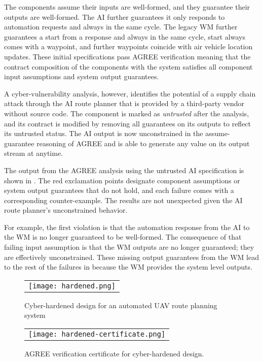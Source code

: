 The components assume their inputs are well-formed, and they guarantee their outputs are well-formed.
The AI further guarantees it only responds to automation requests and always in the same cycle.
The legacy WM further guarantees a start from a response and always in the same cycle, start always comes with a waypoint, and further waypoints coincide with air vehicle location updates.
These initial specifications pass AGREE verification meaning that the contract composition of the components with the system satisfies all component input assumptions and system output guarantees.

A cyber-vulnerability analysis, however, identifies the potential of a supply chain attack through the AI route planner that is provided by a third-party vendor without source code.
The component is marked as \emph{untrusted} after the analysis, and its contract is modified by removing all guarantees on its outputs to reflect its untrusted status.
The AI output is now unconstrained in the assume-guarantee reasoning of AGREE and is able to generate any value on its output stream at anytime.

The output from the AGREE analysis using the untrusted AI specification is shown in .
The red exclamation points designate component assumptions or system output guarantees that do not hold, and each failure comes with a corresponding counter-example.
The results are not unexpected given the AI route planner's unconstrained behavior.

For example, the first violation is that the automation response from the AI to the WM is no longer guaranteed to be well-formed.
The consequence of that failing input assumption is that the WM outputs are no longer guaranteed; they are effectively unconstrained.
These missing output guarantees from the WM lead to the rest of the failures in  because the WM provides the system level outputs.

\begin{figure*}
  \begin{center}
    \begin{tabular}{c}
      \texttt{[image: hardened.png]}
    \end{tabular}
  \end{center}
  \caption{Cyber-hardened design for an automated UAV route planning system}
  \label{fig:hardened}
\end{figure*}

\begin{figure}
  \begin{center}
    \begin{tabular}{c}
      \texttt{[image: hardened-certificate.png]}
    \end{tabular}
  \end{center}
  \caption{AGREE verification certificate for cyber-hardened design.}
  \label{fig:hardened-certificate}
\end{figure}

